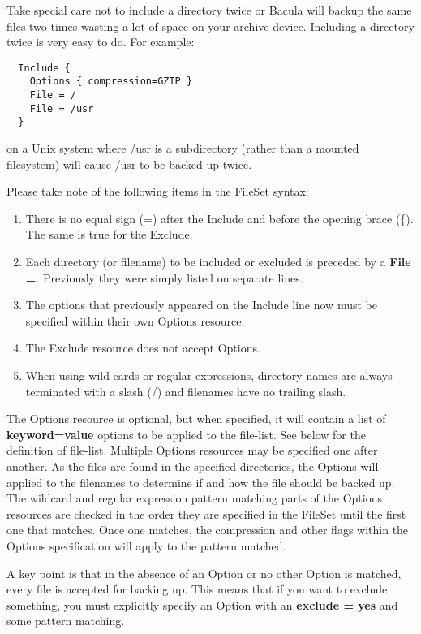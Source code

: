 Take special care not to include a directory twice or Bacula will backup
the same files two times wasting a lot of space on your archive device.
Including a directory twice is very easy to do.  For example:

\footnotesize
\begin{verbatim}
  Include {
    Options { compression=GZIP }
    File = /
    File = /usr
  }
\end{verbatim}
\normalsize

on a Unix system where /usr is a subdirectory (rather than a mounted
filesystem) will cause /usr to be backed up twice.

Please take note of the following items in the FileSet syntax: 

\begin{enumerate}
\item There is no equal sign (=) after the Include and before the opening
   brace (\{). The same is true for the Exclude. 
\item Each directory (or filename) to be included or excluded is preceded by a {\bf File
   =}.  Previously they were simply listed on separate lines. 
\item The options that previously appeared on the Include line now must be
   specified within their own Options resource.
\item The Exclude resource does not accept Options. 
\item When using wild-cards or regular expressions, directory names are
   always terminated with a slash (/) and filenames have no trailing slash.
\end{enumerate}

The Options resource is optional, but when specified, it will contain a
list of {\bf keyword=value} options to be applied to the file-list.
See below for the definition of file-list.    
Multiple Options resources may be specified one after another.  As the
files are found in the specified directories, the Options will applied to
the filenames to determine if and how the file should be backed up.  The
wildcard and regular expression pattern matching parts of the
Options resources are checked in the order they are specified in the
FileSet until the first one that matches. Once one matches, the
compression and other flags within the Options specification will
apply to the pattern matched.

A key point is that in the absence of an Option or no other Option is
matched, every file is accepted for backing up. This means that if
you want to exclude something, you must explicitly specify an Option
with an {\bf exclude = yes} and some pattern matching.

